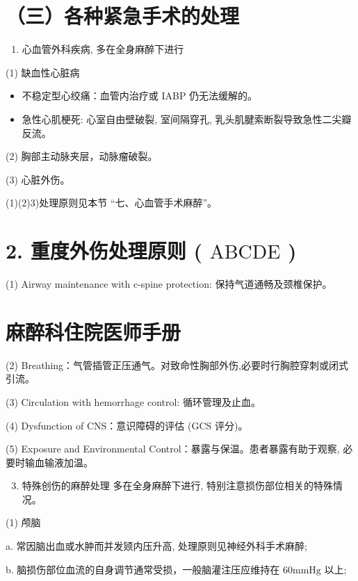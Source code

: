 \documentclass[10pt]{article}
\begin{document}
\section*{（三）各种紧急手术的处理}
\begin{enumerate}
  \item 心血管外科疾病, 多在全身麻醉下进行
\end{enumerate}

(1) 缺血性心脏病

\begin{itemize}
  \item 不稳定型心绞痛：血管内治疗或 IABP 仍无法缓解的。
  \item 急性心肌梗死: 心室自由壁破裂, 室间隔穿孔, 乳头肌腱索断裂导致急性二尖瓣反流。
\end{itemize}

(2) 胸部主动脉夹层，动脉瘤破裂。

(3) 心脏外伤。

(1)(2)3)处理原则见本节 “七、心血管手术麻醉”。

\section*{2. 重度外伤处理原则 ( $\mathrm{ABCDE}$ )}
(1) Airway maintenance with c-spine protection: 保持气道通畅及颈椎保护。

\section*{麻醉科住院医师手册}
(2) Breathing：气管插管正压通气。对致命性胸部外伤,必要时行胸腔穿刺或闭式引流。

(3) Circulation with hemorrhage control: 循环管理及止血。

(4) Dysfunction of CNS：意识障碍的评估 (GCS 评分)。

(5) Exposure and Environmental Control：暴露与保温。患者暴露有助于观察, 必要时输血输液加温。

\begin{enumerate}
  \setcounter{enumi}{2}
  \item 特殊创伤的麻醉处理 多在全身麻醉下进行, 特别注意损伤部位相关的特殊情况。
\end{enumerate}

(1) 颅脑

a. 常因脑出血或水肿而并发颎内压升高, 处理原则见神经外科手术麻醉;

b. 脑损伤部位血流的自身调节通常受损，一般脑灌注压应维持在 $60 \mathrm{mmHg}$ 以上;
\end{document}
